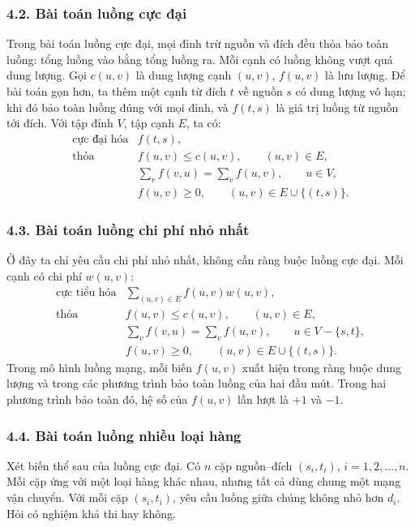 \documentclass[11pt]{article}
\begin{document}
\subsubsection*{4.2. Bài toán luồng cực đại}

Trong bài toán luồng cực đại, mọi đỉnh trừ nguồn và đích đều thỏa bảo toàn
luồng: tổng luồng vào bằng tổng luồng ra. Mỗi cạnh có luồng không vượt quá
dung lượng. Gọi \(c(u,v)\) là dung lượng cạnh \((u,v)\), \(f(u,v)\) là lưu
lượng. Để bài toán gọn hơn, ta thêm một cạnh từ đích \(t\) về nguồn \(s\) có
dung lượng vô hạn; khi đó bảo toàn luồng đúng với mọi đỉnh, và \(f(t,s)\) là
giá trị luồng từ nguồn tới đích. Với tập đỉnh \(V\), tập cạnh \(E\), ta có:
\[
\begin{array}{ll}
\text{cực đại hóa} & f(t,s),\\
\text{thỏa} & f(u,v)\le c(u,v),\qquad (u,v)\in E,\\
& \displaystyle \sum_{v}f(v,u)=\sum_{v}f(u,v),\qquad u\in V,\\
& f(u,v)\ge 0,\qquad (u,v)\in E\cup\{(t,s)\}.
\end{array}
\]

\subsubsection*{4.3. Bài toán luồng chi phí nhỏ nhất}

Ở đây ta chỉ yêu cầu chi phí nhỏ nhất, không cần ràng buộc luồng cực đại. Mỗi
cạnh có chi phí \(w(u,v)\):
\[
\begin{array}{ll}
\text{cực tiểu hóa} & \displaystyle \sum_{(u,v)\in E} f(u,v)w(u,v),\\
\text{thỏa} & f(u,v)\le c(u,v),\qquad (u,v)\in E,\\
& \displaystyle \sum_{v}f(v,u)=\sum_{v}f(u,v),
  \qquad u\in V-\{s,t\},\\
& f(u,v)\ge 0,\qquad (u,v)\in E\cup\{(t,s)\}.
\end{array}
\]
Trong mô hình luồng mạng, mỗi biến \(f(u,v)\) xuất hiện trong ràng buộc dung
lượng và trong các phương trình bảo toàn luồng của hai đầu mút. Trong hai
phương trình bảo toàn đó, hệ số của \(f(u,v)\) lần lượt là \(+1\) và \(-1\).

\subsubsection*{4.4. Bài toán luồng nhiều loại hàng}

Xét biến thể sau của luồng cực đại. Có \(n\) cặp nguồn--đích
\((s_i,t_i)\), \(i=1,2,\ldots,n\). Mỗi cặp ứng với một loại hàng khác nhau,
nhưng tất cả dùng chung một mạng vận chuyển. Với mỗi cặp \((s_i,t_i)\), yêu
cầu luồng giữa chúng không nhỏ hơn \(d_i\). Hỏi có nghiệm khả thi hay không.
\end{document}
